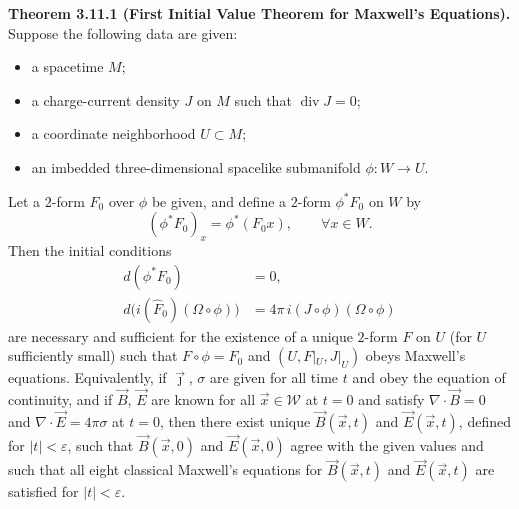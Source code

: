 \textbf{Theorem 3.11.1 (First Initial Value Theorem for Maxwell's Equations).}
Suppose the following data are given:
\begin{itemize}
  \item[(a)] a spacetime $M$;
  \item[(b)] a charge-current density $J$ on $M$ such that $\operatorname{div} J = 0$;
  \item[(c)] a coordinate neighborhood $U \subset M$;
  \item[(d)] an imbedded three-dimensional spacelike submanifold $\phi: W \to U$.
\end{itemize}
Let a $2$-form $F_0$ over $\phi$ be given, and define a $2$-form $\phi^* F_0$ on $W$ by
$$
(\phi^* F_0)_x = \phi^*(F_0 x), \qquad \forall x \in W.
$$
Then the initial conditions
\begin{align}
  d(\phi^* F_0) &= 0, \tag{e_1}\\
  d\bigl(i(\hat{F}_0)(\Omega \circ \phi)\bigr) &= 4\pi\, i(J \circ \phi)(\Omega \circ \phi) \tag{e_2}
\end{align}
are necessary and sufficient for the existence of a unique $2$-form $F$ on $U$ (for $U$ sufficiently small) such that $F \circ \phi = F_0$ and $(U, F|_U, J|_U)$ obeys Maxwell's equations.
Equivalently, if $\vec{\jmath}$, $\sigma$ are given for all time $t$ and obey the equation of continuity, and if $\vec{B}$, $\vec{E}$ are known for all $\vec{x} \in \mathcal{W}$ at $t = 0$ and satisfy $\nabla \cdot \vec{B} = 0$ and $\nabla \cdot \vec{E} = 4\pi\sigma$ at $t = 0$, then there exist unique $\vec{B}(\vec{x}, t)$ and $\vec{E}(\vec{x}, t)$, defined for $|t| < \varepsilon$, such that $\vec{B}(\vec{x}, 0)$ and $\vec{E}(\vec{x}, 0)$ agree with the given values and such that all eight classical Maxwell's equations for $\vec{B}(\vec{x}, t)$ and $\vec{E}(\vec{x}, t)$ are satisfied for $|t| < \varepsilon$.

